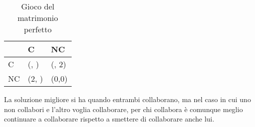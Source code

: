 \documentclass[\main/main.tex]{subfiles}
\begin{document}
\begin{table}
  \begin{tabular}{|L|L|L|}
    \hline
       & C                      & NC             \\
    \hline
    C  & (, ) & (, 2) \\
    \hline
    NC & (2, )         & (0,0)          \\
    \hline
  \end{tabular}
  \caption{Gioco del matrimonio perfetto}
\end{table}

La soluzione migliore si ha quando entrambi collaborano, ma nel caso in cui uno non collabori e l'altro voglia collaborare, per chi collabora è comunque meglio continuare a collaborare rispetto a smettere di collaborare anche lui.
\end{document}
